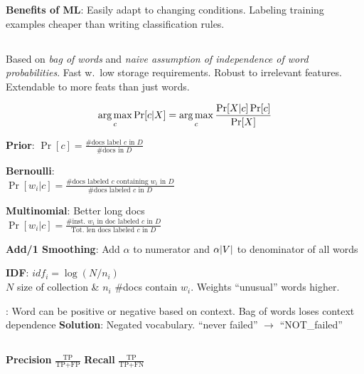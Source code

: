 \documentclass[8pt]{extarticle}
\renewcommand{\green}[1]{{\color{ForestGreen} #1}}
\newcommand{\greenbf}[1]{\textbf{\green{#1}}}
\newcommand{\redbf}[1]{\textbf{\red{#1}}}
\begin{document}
\begin{multicols}{3}
  \textbf{Benefits of ML}: Easily adapt to changing conditions. Labeling training examples cheaper than writing classification rules.

  \subsection*{}

  Based on \textit{bag of words} and \textit{naive assumption of independence of word probabilities}. Fast w.\ low storage requirements. Robust to irrelevant features. Extendable to more feats than just words.

  \begin{equation*}\label{eq:L02:NaiveBayes}
    \operatorname*{arg\,max}_c \Pr\lbrack c \vert X\rbrack = \operatorname*{arg\,max}_{c} \frac{\Pr[X \vert c] \Pr[c]}{\Pr[X]}
  \end{equation*}

  \greenbf{Prior}: $\Pr[c] = \frac{\text{\#docs label } c \text{ in } D}{\text{\#docs in } D}$

  \greenbf{Bernoulli}: \\ $\Pr[w_ i \vert c] = \frac{\text{\# docs labeled } c \text{ containing } w_i \text{ in } D}{\text{\#docs labeled } c \text{ in } D}$

  \greenbf{Multinomial}: Better long docs \\ $\Pr[w_i \vert c] = \frac{\text{\# inst.\ } w_i \text{ in doc labeled } c \text{ in } D}{\text{Tot.\ len docs labeled } c \text{ in } D}$

  \greenbf{Add\-/1 Smoothing}: Add $\alpha$ to numerator and $\alpha\lvert V\rvert$ to denominator of all words

  \greenbf{IDF}: $idf_i = \log \left(N/n_i\right)$ \\ $N$ size of collection \& $n_i$ \#docs contain $w_i$. Weights ``unusual'' words higher.

  \redbf{Problem}: Word can be positive or negative based on context. Bag of words loses context dependence
  \textbf{Solution}: Negated vocabulary. ``never failed'' $\rightarrow$ ``NOT\_failed''

  \subsection*{}

  \greenbf{Precision} $\frac{\text{TP}}{\text{TP} + \text{FP}}$ \hspace{0.1cm} \greenbf{Recall} $\frac{\text{TP}}{\text{TP} + \text{FN}}$


\end{multicols}
\end{document}
